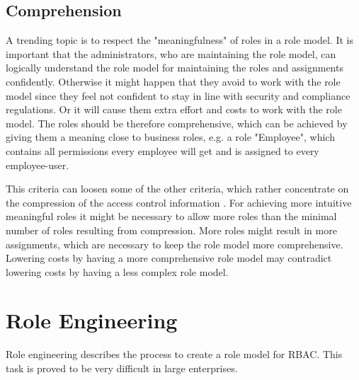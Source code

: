         \subsection{Comprehension}
        \label{sec:comprehension}
        A trending topic is to respect the "meaningfulness" of roles in a role model\cite{Xu}\cite{Frank}. It is important that the administrators, who are maintaining the role model, can logically understand the role model for maintaining the roles and assignments confidently. Otherwise it might happen that they avoid to work with the role model since they feel not confident to stay in line with security and compliance regulations. Or it will cause them extra effort and costs to work with the role model. The roles should be therefore comprehensive, which can be achieved by giving them a meaning close to business roles, e.g. a role "Employee", which contains all permissions every employee will get and is assigned to every employee-user.
        
        This criteria can loosen some of the other criteria, which rather concentrate on the compression of the access control information \cite{Frank:2013}. For achieving more intuitive meaningful roles it might be necessary to allow more roles than the minimal number of roles resulting from compression. More roles might result in more assignments, which are necessary to keep the role model more comprehensive. Lowering costs by having a more comprehensive role model may contradict lowering costs by having a less complex role model.
        \iffalse
        In praxis the roles can be often bundled according to the user attributes Internal or External employee, Organizational Unit and Job Function. The pyramid in figure \ref{fig:rolePyramid} demonstrates how easily user-permission assignments can be covered by roles.
        
        \begin{figure}[H]
            \centering
            \texttt{[image: Role\_Pyramid]}
            \caption{Pyramid of general roles depending on user attributes. Most often roles can be described by the user attributes Internal or External employee, Organizational Unit and Job Function.}
            \label{fig:rolePyramid}
        \end{figure}
        \fi
    
    \section{Role Engineering}
    Role engineering \cite{Coyne:2011} describes the process to create a role model for RBAC. This task is proved to be very difficult in large enterprises.
    
